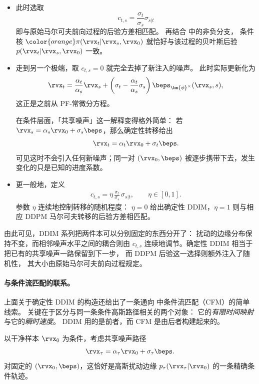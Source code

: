 \begin{itemize}
\item {}
此时选取
\[
c_{t,s}
=
\frac{\sigma_t}{\sigma_s}\sigma_{s|t}
\]
即与原始马尔可夫前向过程的后验方差相匹配。
再结合  中的非负分支，
条件核 ${\color{orange}\pi(\rvx_t|\rvx_s,\rvx_0)}$
就恰好与该过程的贝叶斯后验 $p(\rvx_t|\rvx_s,\rvx_0)$ 一致。

\item {}
走到另一个极端，取 $c_{t,s}=0$ 就完全去掉了新注入的噪声。
此时实际更新化为
\[
\rvx_t
=
\frac{\alpha_t}{\alpha_s}\rvx_s
+
\left(
\sigma_t
-
\frac{\alpha_t}{\alpha_s}\sigma_s
\right)
\beps_{\bm{\phi}^\times}(\rvx_s,s),
\]
这正是之前从
PF-常微分方程。

在条件层面，「共享噪声」这一解释变得格外简单：
若 $\rvx_s=\alpha_s\rvx_0+\sigma_s\beps$，那么确定性转移给出
\[
\rvx_t
=
\alpha_t\rvx_0+\sigma_t\beps.
\]
可见这时不会引入任何新噪声；同一对 $(\rvx_0,\beps)$
被逐步携带下去，发生变化的只是已知的进度系数。

\item {}
更一般地，定义
\begin{align}
\label{eq:eta-ddim}
c_{t,s}
=
\eta\,
\frac{\sigma_t}{\sigma_s}\,
\sigma_{s|t},
\qquad
\eta\in[0,1].
\end{align}
参数 $\eta$ 连续地控制转移的随机程度：
$\eta=0$ 给出确定性 DDIM，$\eta=1$ 则与相应 DDPM
马尔可夫转移的后验方差相匹配。
\end{itemize}

由此可见，DDIM 系列把两件本可以分别固定的东西分开了：
扰动的边缘分布保持不变，而相邻噪声水平之间的耦合则由 $c_{t,s}$ 连续地调节。确定性 DDIM
相当于把已有的共享噪声一路保留到下一步，
而 DDPM 后验这一选择则额外注入了随机性，
其大小由原始马尔可夫前向过程规定。

\paragraph{与条件流匹配的联系。}
上面关于确定性 DDIM 的构造还给出了一条通向
 中条件流匹配（CFM）的简单线索。
关键在于区分与同一条条件高斯路径相关的两个对象：
它的\emph{有限时间映射}与它的\emph{瞬时速度}。
DDIM 用的是前者，而 CFM 是由后者构建起来的。

以干净样本 $\rvx_0$ 为条件，考虑共享噪声路径
\[
\rvx_\tau
=
\alpha_\tau\rvx_0
+
\sigma_\tau\beps.
\]
对固定的 $(\rvx_0,\beps)$，这恰好是高斯扰动边缘
$p_\tau(\rvx_\tau|\rvx_0)$ 的一条精确条件轨迹。

